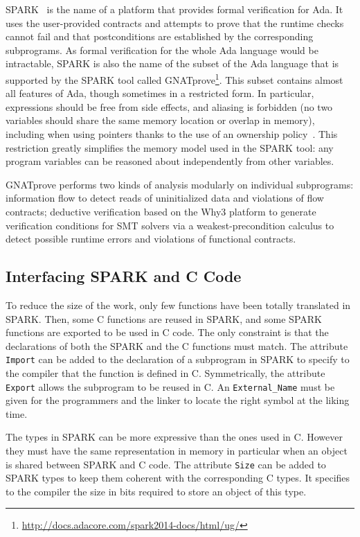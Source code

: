 \documentclass[runningheads]{llncs}
\begin{document}
SPARK~\cite{mccormick2015building} is the name of a platform that provides
formal verification for Ada. It uses the user-provided contracts and attempts
to prove that the runtime checks cannot fail and that postconditions are
established by the corresponding subprograms.  As formal verification for the
whole Ada language would be intractable, SPARK is also the name of the subset
of the Ada language that is supported by the SPARK tool called
GNATprove\footnote{\url{http://docs.adacore.com/spark2014-docs/html/ug/}}.
This subset contains almost all features of Ada, though sometimes in a
restricted form.  In particular, expressions should be free from side effects,
and aliasing is forbidden (no two variables should share the same memory
location or overlap in memory), including when using pointers thanks to the use
of an ownership policy~\cite{dross2020recursive}.  This restriction greatly
simplifies the memory model used in the SPARK tool: any program variables can
be reasoned about independently from other variables.

GNATprove performs two kinds of analysis modularly on individual subprograms:
information flow to detect reads of uninitialized data and violations of flow
contracts; deductive verification based on the Why3 platform to generate
verification conditions for SMT solvers via a weakest-precondition calculus to
detect possible runtime errors and violations of functional contracts.

\subsection{Interfacing SPARK and C Code}

    To reduce the size of the work, only few functions have been totally translated
    in SPARK. Then, some C functions are reused in SPARK, and some SPARK functions
    are exported to be used in C code. The only constraint is that the
    declarations of both the SPARK and the C functions must match.
    The attribute \lstinline{Import} can be added to the declaration of a
    subprogram in SPARK to specify to the compiler that the function is defined
    in C. Symmetrically, the attribute \lstinline{Export} allows the subprogram
    to be reused in C. An \lstinline{External_Name} must be given for the
    programmers and the linker to locate the right symbol at the liking time.


    The types in SPARK can be more expressive than the ones used in C. However
    they must have the same representation in memory in particular when an
    object is shared between SPARK and C code.
    The attribute \lstinline{Size} can be added to SPARK types to keep them
    coherent with the corresponding C types. It specifies to the compiler the
    size in bits required to store an object of this type.
\end{document}
